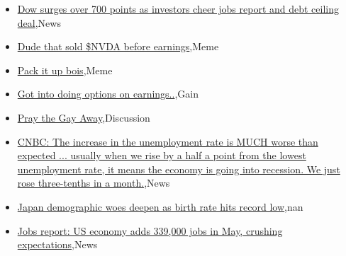 \documentclass{article}%
\begin{document}
%
\begin{itemize}%
\item%
\href{https://reddit.com/r/wallstreetbets/comments/13z6tna/dow\_surges\_over\_700\_points\_as\_investors\_cheer/}{Dow surges over 700 points as investors cheer jobs report and debt ceiling deal},News%
\item%
\href{https://reddit.com/r/wallstreetbets/comments/13yyk40/dude\_that\_sold\_nvda\_before\_earnings/}{Dude that sold \$NVDA before earnings},Meme%
\item%
\href{https://reddit.com/r/wallstreetbets/comments/13ywrcw/pack\_it\_up\_bois/}{Pack it up bois},Meme%
\item%
\href{https://reddit.com/r/wallstreetbets/comments/13yw8sd/got\_into\_doing\_options\_on\_earnings/}{Got into doing options on earnings..},Gain%
\item%
\href{https://reddit.com/r/wallstreetbets/comments/13yuxsk/pray\_the\_gay\_away/}{Pray the Gay Away},Discussion%
\item%
\href{https://reddit.com/r/StockMarket/comments/13z4wq9/cnbc\_the\_increase\_in\_the\_unemployment\_rate\_is/}{CNBC: The increase in the unemployment rate is MUCH worse than expected ... usually when we rise by a half a point from the lowest unemployment rate, it means the economy is going into recession. We just rose three-tenths in a month.},News%
\item%
\href{https://reddit.com/r/Economics/comments/13yj5r1/japan\_demographic\_woes\_deepen\_as\_birth\_rate\_hits/}{Japan demographic woes deepen as birth rate hits record low},nan%
\item%
\href{https://reddit.com/r/Economics/comments/13ybj4z/jobs\_report\_us\_economy\_adds\_339000\_jobs\_in\_may/}{Jobs report: US economy adds 339,000 jobs in May, crushing expectations},News%
\end{itemize}%
\end{document}
